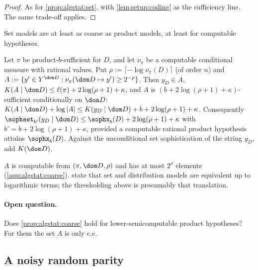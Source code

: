 \begin{proof}
As for \cref{prop:algstat:set}, with \cref{lem:setup:coding} as the sufficiency line. The same trade-off applies.
\end{proof}

Set models are at least as coarse as product models, at least for computable hypotheses.

\begin{proposition}\label{prop:algstat:coarse}
Let $\pi$ be product-$b$-sufficient for $D$, and let $\nu_\pi$ be a computable conditional measure with rational values. Put $\rho:=\lceil-\log\nu_\pi(D)\rceil$ (of order $n$) and $A:=\{y'\in Y^{\dom D}:\nu_\pi(\dom D\mapsto y')\ge2^{-\rho}\}$. Then $y_D\in A$, $K(A\mid\dom D)\le\ell(\pi)+2\log(\rho+1)+\kappa$, and $A$ is $(b+2\log(\rho+1)+\kappa)$-sufficient conditionally on $\dom D$: $K(A\mid\dom D)+\log|A|\le K(y_D\mid\dom D)+b+2\log(\rho+1)+\kappa$. Consequently $\sophset_{b'}(y_D\mid\dom D)\le\sophx_b(D)+2\log(\rho+1)+\kappa$ with $b'=b+2\log(\rho+1)+\kappa$, provided a computable rational product hypothesis attains $\sophx_b(D)$. Against the unconditional set sophistication of the string $y_D$, add $K(\dom D)$.
\end{proposition}

$A$ is computable from $(\pi,\dom D,\rho)$ and has at most $2^\rho$ elements (\cref{app:algstat:coarse}). \citet{vereshchagin2017algorithmic} state that set and distribution models are equivalent up to logarithmic terms; the thresholding above is presumably that translation.

\paragraph{Open question.}\label{q:algstat:lsc}
Does \cref{prop:algstat:coarse} hold for lower-semicomputable product hypotheses? For them the set $A$ is only c.e.

\subsection{A noisy random parity}\label{sec:algstat:parity}

